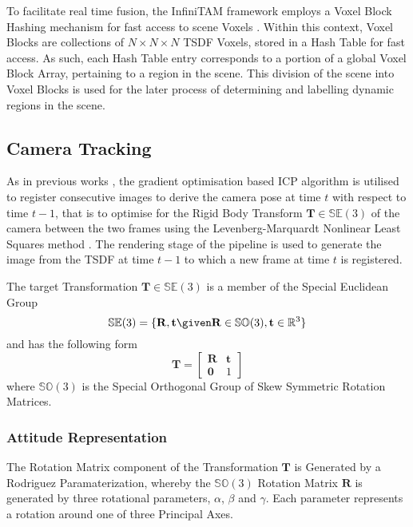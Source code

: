 To facilitate real time fusion, the InfiniTAM framework employs a Voxel Block
Hashing mechanism for fast access to scene Voxels \cite{NieBner2013}. Within
this context, Voxel Blocks are collections of $N \times N \times N$ TSDF Voxels,
stored in a Hash Table for fast access. As such, each Hash Table entry
corresponds to a portion of a global Voxel Block Array, pertaining to a region
in the scene. This division of the scene into Voxel Blocks is used for the later
process of determining and labelling dynamic regions in the scene.

\subsection{Camera Tracking}
\label{subsec:moseg_static_camera_tracking}
As in previous works \cite{Newcombe2011, Prisacariu2014}, the gradient
optimisation based ICP algorithm is utilised to register consecutive images
to derive the camera pose at time $t$ with respect to time $t-1$, that is to
optimise for the Rigid Body Transform $\mathbf{T} \in \mathbb{SE}(3)$ of the
camera between the two frames using the Levenberg-Marquardt Nonlinear Least
Squares method \cite{NumericalRecipes}. The rendering stage of the pipeline
is used to generate the image from the TSDF  at time $t-1$ to which a new frame
at time $t$ is registered.

The target Transformation $\mathbf{T} \in \mathbb{SE}(3)$ is a member of the
Special Euclidean Group
\begin{equation}
  \label{eqn:se3_definition}
  \mathbb{SE}(3) = \{\mathbf{R}, \mathbf{t} \given \mathbf{R} \in
  \mathbb{SO}(3), \mathbf{t} \in \mathbb{R}^{3}\}
\end{equation}
and has the following form
\begin{equation}
  \label{eqn:trans_mat_definition}
  \mathbf{T} =
  \begin{bmatrix}
    \mathbf{R} & \mathbf{t} \\
    \mathbf{0} & 1
  \end{bmatrix}
\end{equation}
where $\mathbb{SO}(3)$ is the Special Orthogonal Group of Skew Symmetric
Rotation Matrices.

\subsubsection{Attitude Representation}
\label{subsub:moseg_static_camera_attitude}
The Rotation Matrix component of the Transformation $\mathbf{T}$ is
Generated by a Rodriguez Paramaterization\cite{Shuster1993}, whereby the
$\mathbb{SO}(3)$ Rotation Matrix $\mathbf{R}$ is generated by three rotational
parameters, $\alpha$, $\beta$ and $\gamma$. Each parameter represents a rotation
around one of three Principal Axes.

